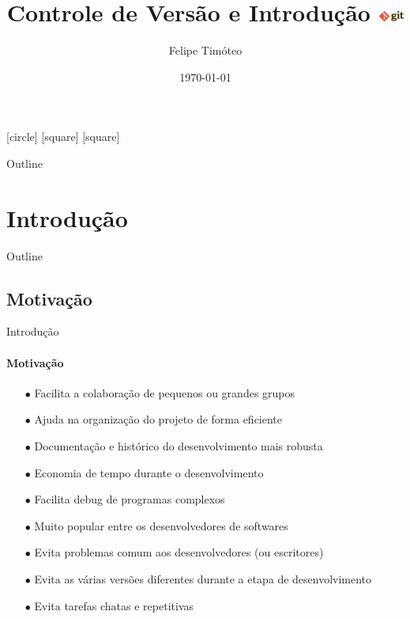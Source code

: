 \documentclass[xcolor=dvipsnames,t]{beamer}
\title[Git]{Controle de Versão e Introdução \includegraphics[height=0.35cm]{figures/gitlogo.png}}
\author[Felipe]{Felipe Timóteo}
\institute{GISIS \& DOT UFF }
\date{\today}
\begin{document}
\begin{frame}
  \titlepage
\end{frame}

[circle]
[square]
[square]
\begin{frame}{Outline}
	\tiny
	\tableofcontents%
\end{frame}

\section{Introdução}
\begin{frame}{Outline}
\tiny
\tableofcontents[current]
\end{frame}

\subsection{Motivação}
\begin{frame}{Introdução}
\framesubtitle{Motivação}

\begin{itemize}
	\item[$ \bullet $] Facilita a colaboração de pequenos ou grandes grupos
	\item[$ \bullet $] Ajuda na organização do projeto de forma eficiente
	\item[$ \bullet $] Documentação e histórico do desenvolvimento mais robusta
	\item[$ \bullet $] Economia de tempo durante o desenvolvimento
	\item[$ \bullet $] Facilita debug de programas complexos
	\item[$ \bullet $] Muito popular entre os desenvolvedores de softwares
	\item[$ \bullet $] Evita problemas comum aos desenvolvedores (ou escritores)
	\item[$ \bullet $] Evita as várias versões diferentes durante a etapa de desenvolvimento
	\item[$ \bullet $] Evita tarefas chatas e repetitivas
\end{itemize}
\end{frame}
\end{document}
